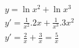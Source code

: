 \begin{ex}
\begin{align}
&y=\ln{x^2}+\ln{x^3}\nonumber\\
&y'=\frac{1}{x^2}.2x+\frac{1}{x^3}.3x^2\nonumber\\
&y'=\frac{2}{x}+\frac{3}{x}=\frac{5}{x}\nonumber
\end{align}
\end{ex}
